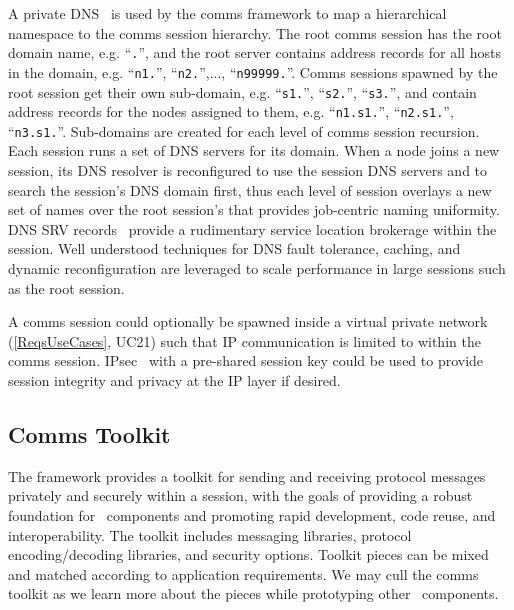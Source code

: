 A private DNS~\cite{rfc1034} is used by the comms framework to
map a hierarchical namespace to the comms session hierarchy.
The root comms session has the root domain name, e.g. ``{\tt \ngrm.}'',
and the root server contains address records for all hosts in the domain, e.g.
``{\tt n1.\ngrm}'', ``{\tt n2.\ngrm}'',..., ``{\tt n99999.\ngrm}''.
Comms sessions spawned by the root session get their own sub-domain, e.g.
``{\tt s1.\ngrm}'', ``{\tt s2.\ngrm}'', ``{\tt s3.\ngrm}'',
and contain address records for the nodes assigned to them, e.g.
``{\tt n1.s1.\ngrm}'', ``{\tt n2.s1.\ngrm}'', ``{\tt n3.s1.\ngrm}''.
Sub-domains are created for each level of comms session recursion.
Each session runs a set of DNS servers for its domain.
When a node joins a new session, its DNS resolver is reconfigured to use
the session DNS servers and to search the session's DNS domain first,
thus each level of session overlays a new set of names over
the root session's that provides job-centric naming uniformity.
DNS SRV records~\cite{rfc2782} provide a rudimentary service location
brokerage within the session.
Well understood techniques for DNS fault tolerance,
caching, and dynamic reconfiguration are leveraged to scale performance
in large sessions such as the root session.
\ifcomments
{}
\fi

A comms session could optionally be spawned inside a virtual private
network (\ref{ReqsUseCases}, UC21) such that IP communication
is limited to within the comms session.  IPsec~\cite{rfc2401} with
a pre-shared session key could be used to provide session integrity and
privacy at the IP layer if desired.

\subsection{Comms Toolkit}

The framework provides a toolkit for sending and receiving
protocol messages privately and securely within a session,
with the goals of providing a robust foundation for \ngrm\ components
and promoting rapid development, code reuse, and interoperability.
The toolkit includes messaging libraries,
protocol encoding/decoding libraries, and security options.
Toolkit pieces can be mixed and matched according to application
requirements.  We may cull the comms toolkit as we learn more
about the pieces while prototyping other \ngrm\ components.

